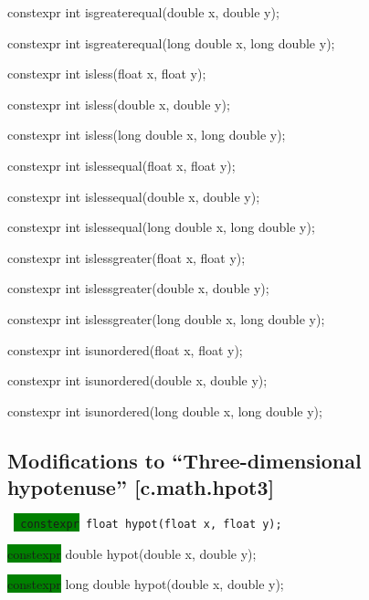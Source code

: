 \documentclass[prd,twocolumn,amsmath,amssymb,nofootinbib,eqsecnum]{revtex4-1}
\newcommand{\code}[1]{{\tt #1}}
\newcommand{\highlight}[1]{\colorbox{green}{\!\!\!\! #1}}
\newcommand{\oldhighlight}[1]{#1}
\begin{document}
{\oldhighlight{constexpr} int isgreaterequal(double x, double y);

\oldhighlight{constexpr} int isgreaterequal(long double x, long double y);

\vspace{2ex}


\oldhighlight{constexpr} int isless(float x, float y);

\oldhighlight{constexpr} int isless(double x, double y);

\oldhighlight{constexpr} int isless(long double x, long double y);

\vspace{2ex}


\oldhighlight{constexpr} int islessequal(float x, float y);

\oldhighlight{constexpr} int islessequal(double x, double y);

\oldhighlight{constexpr} int islessequal(long double x, long double y);

\vspace{2ex}


\oldhighlight{constexpr} int islessgreater(float x, float y);

\oldhighlight{constexpr} int islessgreater(double x, double y);

\oldhighlight{constexpr} int islessgreater(long double x, long double y);

\vspace{2ex}


\oldhighlight{constexpr} int isunordered(float x, float y);

\oldhighlight{constexpr} int isunordered(double x, double y);

\oldhighlight{constexpr} int isunordered(long double x, long double y);

}


\subsection{Modifications to ``Three-dimensional hypotenuse''  [c.math.hpot3]}

\code{
	\highlight{constexpr} float hypot(float x, float y); 

	\highlight{constexpr} double hypot(double x, double y);

	\highlight{constexpr} long double hypot(double x, double y); 
}
\end{document}
